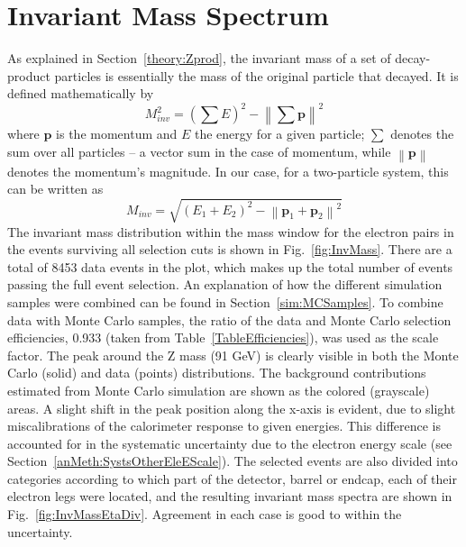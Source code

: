 
\section{Invariant Mass Spectrum} %
\label{anMeth:invmass}
As explained in Section~\ref{theory:Zprod}, %
the invariant mass of a set of decay-product particles is 
essentially the mass of the original particle that decayed. 
It is defined mathematically by %
\[
M_{inv}^2 = \left( \sum E \right)^2 - \left\| \sum \mathbf{p} \right\|^2
\]
where $ \mathbf{p} $ is the momentum 
and $ E $ the energy for a given particle; 
$ \sum $ denotes the sum over all particles 
-- a vector sum in the case of momentum, 
while $\left\| \mathbf{p} \right\|$ denotes the momentum's magnitude.  
In our case, for a two-particle system, this can be written as 
\[
M_{inv} = \sqrt{ \left(E_1 + E_2\right)^2 - \left\|\mathbf{p}_1 + \mathbf{p}_2\right\|^2 }
\]
The invariant mass distribution within the mass window 
for the electron pairs 
in the events surviving all selection cuts is shown in 
Fig.~\ref{fig:InvMass}.  
There are a total of 8453 data events in the plot, 
which makes up the total number of events passing 
the full event selection.  
An explanation of how the different simulation 
samples were combined can be 
found in Section~\ref{sim:MCSamples}.  
To combine data with Monte Carlo samples, 
the ratio of the data and Monte Carlo selection efficiencies, 
0.933 (taken from Table~\ref{TableEfficiencies}), 
was used as the scale factor.  
The peak around the Z mass (91 GeV) is clearly visible 
in both the Monte Carlo (solid) and data (points) distributions.  
The background contributions estimated from Monte Carlo simulation 
are shown as the colored (grayscale) areas.  
A slight shift in the peak position along the x-axis is 
evident, due to slight miscalibrations of 
the calorimeter response to given energies.  
This difference is accounted for in the 
systematic uncertainty due to the electron energy scale 
(see Section~\ref{anMeth:SystsOtherEleEScale}).  
The selected events are also divided into categories according 
to which part of the detector, barrel or endcap, 
each of their electron legs were located, 
and the resulting invariant mass spectra are 
shown in Fig.~\ref{fig:InvMassEtaDiv}.  
Agreement in each case is good to within the 
uncertainty.  

